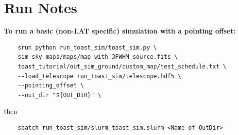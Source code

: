 \section{Run Notes}

{\bf To run a basic (non-LAT specific) simulation with a pointing offset:}
\begin{verbatim}
    srun python run_toast_sim/toast_sim.py \
    sim_sky_maps/maps/map_with_3FWHM_source.fits \
    toast_tutorial/out_sim_ground/custom_map/test_schedule.txt \
    --load_telescope run_toast_sim/telescope.hdf5 \
    --pointing_offset \
    --out_dir "${OUT_DIR}" \
\end{verbatim}
then
\begin{verbatim}
    sbatch run_toast_sim/slurm_toast_sim.slurm <Name of OutDir>
\end{verbatim}

